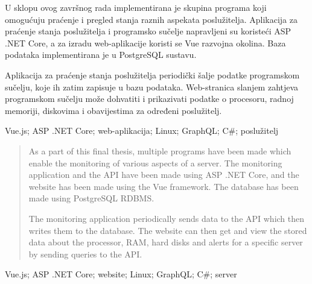 \documentclass[zavrsnirad]{fer}
\begin{document}





\begin{sazetak}
	U sklopu ovog završnog rada implementirana je skupina programa koji omogućuju praćenje i pregled stanja raznih aspekata poslužitelja. Aplikacija za praćenje stanja poslužitelja i programsko sučelje napravljeni su koristeći ASP .NET Core, a za izradu web-aplikacije koristi se Vue razvojna okolina. Baza podataka implementirana je u PostgreSQL sustavu.
	
	Aplikacija za praćenje stanja poslužitelja periodički šalje podatke programskom sučelju, koje ih zatim zapisuje u bazu podataka. Web-stranica slanjem zahtjeva programskom sučelju može dohvatiti i prikazivati podatke o procesoru, radnoj memoriji, diskovima i obavijestima za određeni poslužitelj.
\end{sazetak}

\begin{kljucnerijeci}
  Vue.js; ASP .NET Core; web-aplikacija; Linux; GraphQL; C\#; poslužitelj
\end{kljucnerijeci}


\begin{abstract}
	As a part of this final thesis, multiple programs have been made which enable the monitoring of various aspects of a server. The monitoring application and the API have been made using ASP .NET Core, and the website has been made using the Vue framework. The database has been made using PostgreSQL RDBMS.
	
	The monitoring application periodically sends data to the API which then writes them to the database. The website can then get and view the stored data about the processor, RAM, hard disks and alerts for a specific server by sending queries to the API.
\end{abstract}

\begin{keywords}
	Vue.js; ASP .NET Core; website; Linux; GraphQL; C\#; server
\end{keywords}


\end{document}
